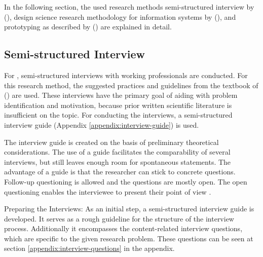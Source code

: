 In the following section,
the used research methods
semi-structured interview
by
\citeauthor{glaser2010experteninterviews} (\citeyear{glaser2010experteninterviews}),
design science research methodology for information systems
by
\citeauthor{designScienceResearchMethodologyForInformationSystemsResearch} (\citeyear{designScienceResearchMethodologyForInformationSystemsResearch}),
and prototyping as described
by
\citeauthor{riedlManagementInformatik2019} (\citeyear{riedlManagementInformatik2019})
are explained in detail.





\subsection{Semi-structured Interview}\label{methodology:interview}

For ,
semi-structured interviews with working professionals
are conducted.
For this research method,
the suggested practices and guidelines from
the textbook of
\citeauthor{glaser2010experteninterviews} (\citeyear{glaser2010experteninterviews})
are used.
These interviews have the primary goal of aiding with
problem identification and motivation,
because prior written scientific literature is insufficient on the topic.
For conducting the interviews,
a semi-structured interview guide (Appendix \ref{appendix:interview-guide}) is used.

The interview guide is created on the basis of preliminary theoretical considerations.
The use of a guide facilitates the comparability of several interviews,
but still leaves enough room for spontaneous statements.
The advantage of a guide is that the researcher can stick to concrete questions.
Follow-up questioning is allowed and the questions are mostly open.
The open questioning enables the interviewee to present their point of view
\autocite{berger2016wissenschaftliches}.



Preparing the Interviews:
As an initial step,
a semi-structured interview guide is developed.
It serves as a rough guideline for the structure of the interview process.
Additionally it encompasses the content-related interview questions,
which are specific to the given research problem.
These questions can be seen at section \ref{appendix:interview-questions} in the appendix.

